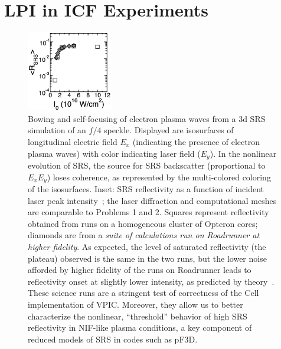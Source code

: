 \documentclass[journal,twoside]{IEEEtran}
\begin{document}
\section{LPI in ICF Experiments}

\begin{figure}
\begin{center}


\vspace{-1.5in}
\hspace{-5.25in}
\includegraphics[height=1.375in]{figs/lpi_comparison.eps}

\vspace{0.125in}
\caption{
Bowing and self-focusing of electron plasma waves from a 3d SRS
simulation of an $f/4$ speckle.  Displayed are isosurfaces of
longitudinal electric field $E_x$ (indicating the presence of electron
plasma waves) with color indicating laser field ($E_y$).  In the
nonlinear evolution of SRS, the source for SRS backscatter
(proportional to $E_x E_y$) loses coherence, as represented by the
multi-colored coloring of the isosurfaces.  Inset: SRS reflectivity as
a function of incident laser peak
intensity~\cite{AAC_Conference_Paper}; the laser diffraction and
computational meshes are comparable to Problems 1 and 2.  Squares
represent reflectivity obtained from runs on a homogeneous cluster of
Opteron cores; diamonds are from a
\textit{suite of calculations run on Roadrunner at higher fidelity}.
As expected, the level of saturated reflectivity (the plateau)
observed is the same in the two runs, but the lower noise afforded by
higher fidelity of the runs on Roadrunner leads to reflectivity onset
at slightly lower intensity, as predicted by
theory~\cite{Yin_et_al_Phys_Plasmas_2006}.  These science runs are a
stringent test of correctness of the Cell implementation of VPIC.
Moreover, they allow us to better characterize the nonlinear,
``threshold'' behavior of high SRS reflectivity in NIF-like plasma
conditions, a key component of reduced models of SRS in codes such as
pF3D.}
\label{fig:lpi}
\end{center}
\end{figure}
\end{document}
